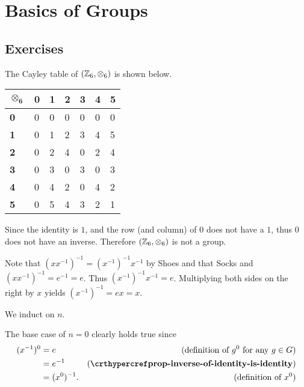 \section{Basics of Groups}
\subsection*{Exercises}
\begin{questions}
    \item The Cayley table of $(\mathbb{Z}_6, \otimes_6)$ is shown below.
    \begin{table}[H]
        \centering
        \begin{tabular}{|l|l|l|l|l|l|l|}
        \hline
        $\boldsymbol{\otimes_6}$ & \textbf{0} & \textbf{1} & \textbf{2} & \textbf{3} & \textbf{4} & \textbf{5} \\ \hline
        \textbf{0} & 0 & 0 & 0 & 0 & 0 & 0 \\ \hline
        \textbf{1} & 0 & 1 & 2 & 3 & 4 & 5 \\ \hline
        \textbf{2} & 0 & 2 & 4 & 0 & 2 & 4 \\ \hline
        \textbf{3} & 0 & 3 & 0 & 3 & 0 & 3 \\ \hline
        \textbf{4} & 0 & 4 & 2 & 0 & 4 & 2 \\ \hline
        \textbf{5} & 0 & 5 & 4 & 3 & 2 & 1 \\ \hline
        \end{tabular}
    \end{table}

    Since the identity is $1$, and the row (and column) of 0 does not have a $1$, thus $0$ does not have an inverse. Therefore $(\mathbb{Z}_6, \otimes_6)$ is not a group.

    \item Note that $(xx^{-1})^{-1} = (x^{-1})^{-1}x^{-1}$ by Shoes and that Socks and $(xx^{-1})^{-1} = e^{-1} = e$. Thus $(x^{-1})^{-1}x^{-1} = e$. Multiplying both sides on the right by $x$ yields $(x^{-1})^{-1} = ex = x$.

    \item We induct on $n$.

    The base case of $n = 0$ clearly holds true since
    \begin{align*}
        (x^{-1})^0 &= e & (\text{definition of }g^0 \text{ for any }g\in G)\\
        &= e^{-1} & (\myref{prop-inverse-of-identity-is-identity})\\
        &= (x^0)^{-1}. & (\text{definition of }x^0)
    \end{align*}


\end{questions}

